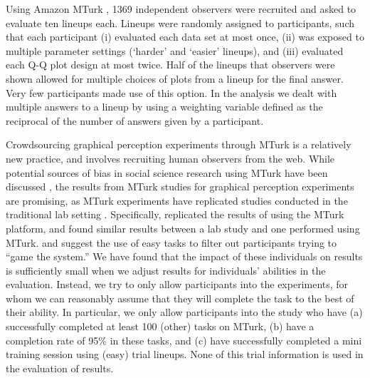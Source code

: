 \documentclass[12pt]{article}\usepackage[]{graphicx}\usepackage[]{color}
\begin{document}
Using  Amazon MTurk \citep{amazon}, 1369 independent observers were recruited and asked to evaluate ten lineups each. Lineups were randomly assigned to participants, such that each participant
(i) evaluated each data set at most once, 
(ii) was exposed to multiple parameter settings (`harder' and `easier' lineups), and
(iii) evaluated each Q-Q plot design at most twice.
Half of the lineups that observers were shown allowed for multiple choices of plots from a lineup for the final answer. Very few participants made use of this option. In the analysis we dealt with multiple answers to a lineup by using a weighting variable defined as the reciprocal of the number of answers given by a participant.

Crowdsourcing graphical perception experiments through MTurk is a relatively new practice, and involves recruiting human observers from the web. While potential sources of bias in social science research using MTurk have been discussed \cite[see, for example,][]{chandler:2014}, the results from MTurk studies for graphical perception experiments are promising, as MTurk experiments have replicated studies conducted in the traditional lab setting \citep{Kosara:2010, Heer:2010}. Specifically, \citet{Heer:2010} replicated the results of \citet{cleveland:1984} using the MTurk platform, and \citet{Kosara:2010} found similar results between a lab study and one performed using MTurk. \citet{Kosara:2010} and \citet{Heer:2010} suggest the use of easy tasks to filter out participants  trying to ``game the system.'' We have found that the impact of these individuals on results is sufficiently small when we adjust results for individuals' abilities in the evaluation. Instead, we try to only allow participants into the experiments, for whom we can reasonably assume that they will complete the task to  the best of their ability.  In particular, we only allow participants into the study who have (a) successfully completed at least 100 (other) tasks on MTurk, (b) have a completion rate of 95\% in these tasks, and (c) have successfully completed a mini training session using (easy) trial lineups. None of this  trial information is used in the evaluation of results.


%
\end{document}
